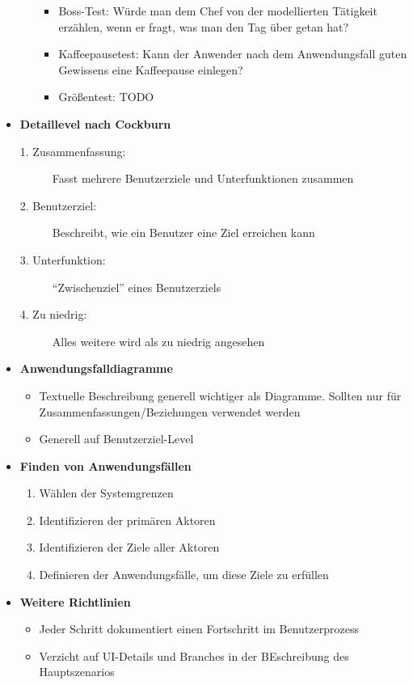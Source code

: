 \begin{itemize}
\begin{itemize}
		\begin{itemize}
			\item Boss-Test: Würde man dem Chef von der modellierten Tätigkeit erzählen, wenn er fragt, was man den Tag über getan hat?
			\item Kaffeepausetest: Kann der Anwender nach dem Anwendungsfall guten Gewissens eine Kaffeepause einlegen?
			\item Größentest: TODO
		\end{itemize}
	\end{itemize}
	\item \textbf{Detaillevel nach Cockburn}
	\begin{description}
		\item[1. Zusammenfassung:] Fasst mehrere Benutzerziele und Unterfunktionen zusammen
		\item[2. Benutzerziel:] Beschreibt, wie ein Benutzer eine Ziel erreichen kann
		\item[3. Unterfunktion:] "`Zwischenziel"' eines Benutzerziels
		\item[4. Zu niedrig:] Alles weitere wird als zu niedrig angesehen
	\end{description}
	\item \textbf{Anwendungsfalldiagramme}
	\begin{itemize}
		\item Textuelle Beschreibung generell wichtiger als Diagramme. Sollten nur für Zusammenfassungen/Beziehungen verwendet werden
		\item Generell auf Benutzerziel-Level 
	\end{itemize}
	\item \textbf{Finden von Anwendungsfällen}
	\begin{enumerate}
		\item Wählen der Systemgrenzen
		\item Identifizieren der primären Aktoren
		\item Identifizieren der Ziele aller Aktoren
		\item Definieren der Anwendungsfälle, um diese Ziele zu erfüllen
	\end{enumerate}
	\item \textbf{Weitere Richtlinien}
	\begin{itemize}
		\item Jeder Schritt dokumentiert einen Fortschritt im Benutzerprozess
		\item Verzicht auf UI-Details und Branches in der BEschreibung des Hauptszenarios
	\end{itemize}
\end{itemize}



